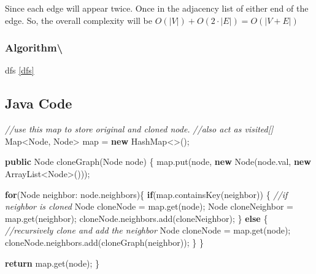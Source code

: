 \documentclass[]{book}
\newenvironment{Shaded}{\begin{snugshade}}{\end{snugshade}}
\newcommand{\BuiltInTok}[1]{#1}
\newcommand{\CommentTok}[1]{\textcolor[rgb]{0.56,0.35,0.01}{\textit{#1}}}
\newcommand{\FunctionTok}[1]{\textcolor[rgb]{0.00,0.00,0.00}{#1}}
\newcommand{\KeywordTok}[1]{\textcolor[rgb]{0.13,0.29,0.53}{\textbf{#1}}}
\newcommand{\NormalTok}[1]{#1}
\begin{document}
Since each edge will appear twice. Once in the adjacency list of either end of the edge. So, the overall complexity
will be \(O(|V|) + O(2 \cdot |E|) = O(|V + E|)\)

\hypertarget{algorithm-106}{%
\subsubsection{Algorithm\textbackslash{}}\label{algorithm-106}}

dfs \ref{dfs}

\hypertarget{java-code-61}{%
\subsection{Java Code}\label{java-code-61}}

\begin{Shaded}
\begin{Highlighting}[]
\CommentTok{//use this map to store original and cloned node.}
\CommentTok{//also act as visited[]}
\BuiltInTok{Map}\NormalTok{<}\BuiltInTok{Node}\NormalTok{, }\BuiltInTok{Node}\NormalTok{> map = }\KeywordTok{new} \BuiltInTok{HashMap}\NormalTok{<>();}

\KeywordTok{public} \BuiltInTok{Node} \FunctionTok{cloneGraph}\NormalTok{(}\BuiltInTok{Node}\NormalTok{ node) \{}
\NormalTok{    map.}\FunctionTok{put}\NormalTok{(node, }\KeywordTok{new} \BuiltInTok{Node}\NormalTok{(node.}\FunctionTok{val}\NormalTok{, }\KeywordTok{new} \BuiltInTok{ArrayList}\NormalTok{<}\BuiltInTok{Node}\NormalTok{>()));}

    \KeywordTok{for}\NormalTok{(}\BuiltInTok{Node}\NormalTok{ neighbor: node.}\FunctionTok{neighbors}\NormalTok{)\{}
        \KeywordTok{if}\NormalTok{(map.}\FunctionTok{containsKey}\NormalTok{(neighbor)) \{}
            \CommentTok{//if neighbor is cloned}
            \BuiltInTok{Node}\NormalTok{ cloneNode = map.}\FunctionTok{get}\NormalTok{(node);}
            \BuiltInTok{Node}\NormalTok{ cloneNeighbor = map.}\FunctionTok{get}\NormalTok{(neighbor);}
\NormalTok{            cloneNode.}\FunctionTok{neighbors}\NormalTok{.}\FunctionTok{add}\NormalTok{(cloneNeighbor);}
\NormalTok{        \} }\KeywordTok{else}\NormalTok{ \{}
            \CommentTok{//recursively clone and add the neighbor}
            \BuiltInTok{Node}\NormalTok{ cloneNode = map.}\FunctionTok{get}\NormalTok{(node);}
\NormalTok{            cloneNode.}\FunctionTok{neighbors}\NormalTok{.}\FunctionTok{add}\NormalTok{(}\FunctionTok{cloneGraph}\NormalTok{(neighbor));}
\NormalTok{        \}}
\NormalTok{    \}}

    \KeywordTok{return}\NormalTok{ map.}\FunctionTok{get}\NormalTok{(node);}
\NormalTok{\}}
\end{Highlighting}
\end{Shaded}
\end{document}
